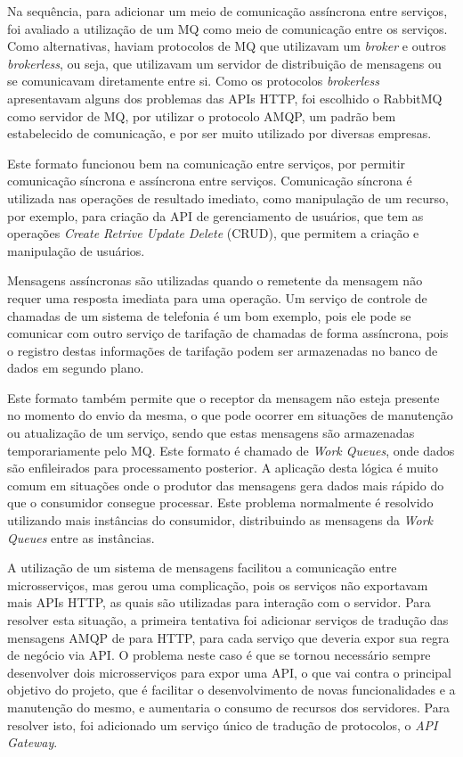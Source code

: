 Na sequência, para adicionar um meio de comunicação assíncrona entre serviços,
foi avaliado a utilização de um \ac{MQ} como meio de comunicação entre os
serviços. Como alternativas, haviam protocolos de \ac{MQ} que utilizavam um
\emph{broker} e outros \emph{brokerless}, ou seja, que utilizavam um servidor
de distribuição de mensagens ou se comunicavam diretamente entre si. Como os
protocolos \emph{brokerless} apresentavam alguns dos problemas das \acp{API}
\ac{HTTP}, foi escolhido o RabbitMQ como servidor de \ac{MQ}, por utilizar o
protocolo \ac{AMQP}, um padrão bem estabelecido de comunicação, e por ser
muito utilizado por diversas empresas.

Este formato funcionou bem na comunicação entre serviços, por permitir comunicação
síncrona e assíncrona entre serviços. Comunicação síncrona é utilizada nas operações
de resultado imediato, como manipulação de um recurso, por exemplo, para criação
da \ac{API} de gerenciamento de usuários, que tem as operações \emph{Create Retrive
Update Delete} (CRUD), que permitem a criação e manipulação de usuários.

Mensagens assíncronas são utilizadas quando o remetente da mensagem não requer uma
resposta imediata para uma operação. Um serviço de controle de chamadas de um
sistema de telefonia é um bom exemplo, pois ele pode se comunicar com outro
serviço de tarifação de chamadas de forma assíncrona, pois o registro destas
informações de tarifação podem ser armazenadas no banco de dados em segundo
plano.

Este formato também permite que o receptor da mensagem não esteja
presente no momento do envio da mesma, o que pode ocorrer em situações de
manutenção ou atualização de um serviço, sendo que estas mensagens são
armazenadas temporariamente pelo \ac{MQ}. Este formato é chamado de
\emph{Work Queues}, onde dados são enfileirados para processamento
posterior. A aplicação desta lógica é muito comum em situações onde o
produtor das mensagens gera dados mais rápido do que o consumidor consegue
processar. Este problema normalmente é resolvido utilizando mais instâncias
do consumidor, distribuindo as mensagens da \emph{Work Queues} entre as
instâncias.

A utilização de um sistema de mensagens facilitou a comunicação entre microsserviços,
mas gerou uma complicação, pois os serviços não exportavam mais \acp{API} \ac{HTTP},
as quais são utilizadas para interação com o servidor. Para resolver esta situação,
a primeira tentativa foi adicionar serviços de tradução das mensagens \ac{AMQP} de
para \ac{HTTP}, para cada serviço que deveria expor sua regra de negócio via \ac{API}.
O problema neste caso é que se tornou necessário sempre desenvolver dois microsserviços
para expor uma \ac{API}, o que vai contra o principal objetivo do projeto, que é facilitar
o desenvolvimento de novas funcionalidades e a manutenção do mesmo, e aumentaria o
consumo de recursos dos servidores. Para resolver isto, foi adicionado um serviço
único de tradução de protocolos, o \emph{API Gateway}.


